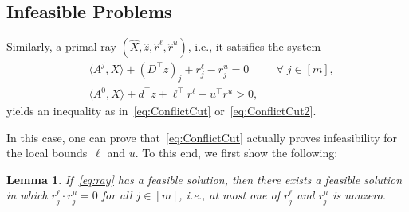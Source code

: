 \documentclass[10pt, a4paper]{article}
\newcommand{\skal}[2]{\langle{#1},{#2}\rangle}
\newcommand{\T}{^{\top}}
\newtheorem{lemma}[theorem]{Lemma}
\begin{document}
\subsection{Infeasible Problems}

Similarly, a primal ray $(\hat{X}, \hat{z}, \hat{r}^\ell, \hat{r}^u)$,
i.e., it satsifies the system
\begin{equation}\label{eq:ray}
\begin{aligned}
  & \skal{A^j}{X} + (D\T z)_j + r^\ell_j - r^u_j = 0 && \forall\; j \in [m],\\
  & \skal{A^0}{X} + d\T z + \ell\T r^\ell - u\T r^u > 0,
\end{aligned}
\end{equation}
yields an inequality as in~\eqref{eq:ConflictCut}
or~\eqref{eq:ConflictCut2}.

In this case, one can prove that~\eqref{eq:ConflictCut} actually proves
infeasibility for the local bounds~$\ell$ and $u$. To this end, we first
show the following:

\begin{lemma}\label{lemma:ComplemenatrySolution}
  If~\eqref{eq:ray} has a feasible solution, then there exists a feasible
  solution in which $r_j^\ell \cdot r_j^u = 0$ for all $j \in [m]$, i.e.,
  at most one of $r_j^\ell$ and $r_j^u$ is nonzero.
\end{lemma}
\end{document}
